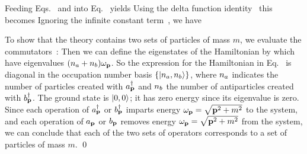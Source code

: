 {	Feeding Eqs.~ and  into Eq.~ yields
	Using the delta function identity~\cite{Dirac}
	this becomes
	Ignoring the infinite constant term~\cite[p.~21]{Peskin}, we have
	
	To show that the theory contains two sets of particles of mass $m$, we evaluate the commutators~\cite[p.~22]{Peskin}:
	Then we can define the eigenstates of the Hamiltonian by
	\eq{
		(\apdag)^{\na} \,(\bpdag)^{\nb} \koo \equiv \knanb,
	}
	which have eigenvalues $(n_a + n_b) \omega_{\vb{p}}$.  So the expression for the Hamiltonian in Eq.~ is diagonal in the occupation number basis $\{ \ket{n_a, n_b} \}$, where $n_a$ indicates the number of particles created with $a_{\vb{p}}^\dagger$ and $n_b$ the number of antiparticles created with $b_{\vb{p}}^\dagger$.  The ground state is $\ket{0, 0}$; it has zero energy since its eigenvalue is zero.  Since each operation of $a_{\vb{p}}^\dagger$ or $b_{\vb{p}}^\dagger$ imparts energy $\omega_{\vb{p}} = \sqrt{\vb{p}^2 + m^2}$ to the system, and each operation of $a_{\vb{p}}$ or $b_{\vb{p}}$ removes energy $\omega_{\vb{p}} = \sqrt{\vb{p}^2 + m^2}$ from the system, we can conclude that each of the two sets of operators corresponds to a set of particles of mass $m$. \qed
}



